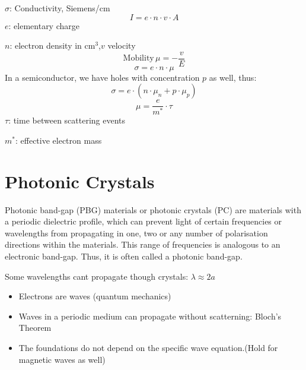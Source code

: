  \(\sigma\): Conductivity, Siemens/cm
 \[
 I = e \cdot n \cdot v \cdot A
 \]
 \(e\): elementary charge

 \(n\): electron density in \(\text{cm}^3\),\(v\) velocity
\[
\text{Mobility}\, \mu = -\frac{v}{E}
\]
\[
\sigma = e \cdot n \cdot \mu
\]
In a semiconductor, we have holes with concentration \(p\) as well, thus:
\[
\sigma = e \cdot (n\cdot \mu_n + p \cdot \mu_p)
\]
\[
\mu = \frac{e}{m^*} \cdot \tau
\]
\(\tau\): time between scattering events

\(m^*\): effective electron mass


\section{Photonic Crystals}
Photonic band-gap (PBG) materials or photonic crystals (PC) are materials
with a periodic dielectric profile,
which can prevent light of certain frequencies or wavelengths
from propagating in one, two or any number of polarisation directions
within the materials.
This range of frequencies is analogous to an electronic band-gap.
Thus, it is often called a photonic band-gap.

Some wavelengths cant propagate though crystals: \(\lambda\approx 2 a\)

\begin{itemize}
    \item Electrons are waves (quantum mechanics)
    \item Waves in a periodic medium can propagate without scatterning: Bloch's Theorem
    \item The foundations do not depend on the specific wave equation.(Hold for magnetic waves as well)
\end{itemize}

